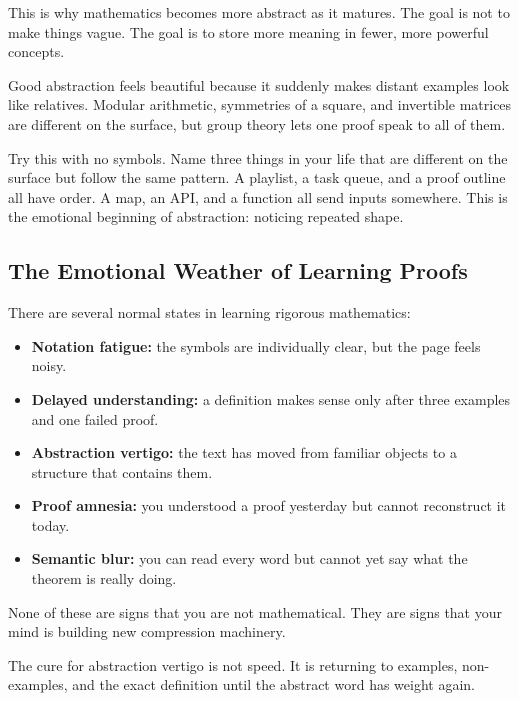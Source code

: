 This is why mathematics becomes more abstract as it matures. The goal is not to
make things vague. The goal is to store more meaning in fewer, more powerful
concepts.

\begin{aestheticbox}
Good abstraction feels beautiful because it suddenly makes distant examples
look like relatives. Modular arithmetic, symmetries of a square, and invertible
matrices are different on the surface, but group theory lets one proof speak to
all of them.
\end{aestheticbox}

\begin{recoverybox}
Try this with no symbols. Name three things in your life that are different on
the surface but follow the same pattern. A playlist, a task queue, and a proof
outline all have order. A map, an API, and a function all send inputs somewhere.
This is the emotional beginning of abstraction: noticing repeated shape.
\end{recoverybox}

\subsection{The Emotional Weather of Learning Proofs}

There are several normal states in learning rigorous mathematics:

\begin{itemize}
\item \textbf{Notation fatigue:} the symbols are individually clear, but the page feels noisy.
\item \textbf{Delayed understanding:} a definition makes sense only after three examples and one failed proof.
\item \textbf{Abstraction vertigo:} the text has moved from familiar objects to a structure that contains them.
\item \textbf{Proof amnesia:} you understood a proof yesterday but cannot reconstruct it today.
\item \textbf{Semantic blur:} you can read every word but cannot yet say what the theorem is really doing.
\end{itemize}

None of these are signs that you are not mathematical. They are signs that your
mind is building new compression machinery.

\begin{focusbox}
The cure for abstraction vertigo is not speed. It is returning to examples,
non-examples, and the exact definition until the abstract word has weight again.
\end{focusbox}

